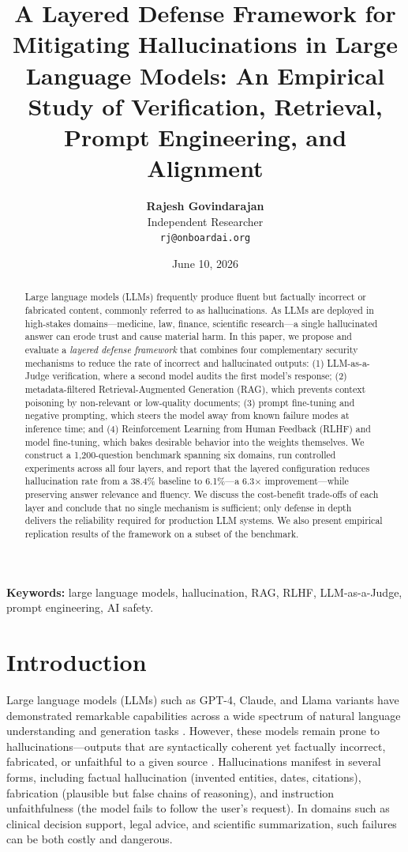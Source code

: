 \documentclass[11pt,a4paper]{article}
\title{\textbf{A Layered Defense Framework for Mitigating Hallucinations in Large Language Models: An Empirical Study of Verification, Retrieval, Prompt Engineering, and Alignment}}
\author{\textbf{Rajesh Govindarajan} \\ Independent Researcher \\ \texttt{rj@onboardai.org}}
\date{June 10, 2026}
\begin{document}
\maketitle

\begin{abstract}
Large language models (LLMs) frequently produce fluent but factually incorrect or fabricated content, commonly referred to as hallucinations. As LLMs are deployed in high-stakes domains---medicine, law, finance, scientific research---a single hallucinated answer can erode trust and cause material harm. In this paper, we propose and evaluate a \textit{layered defense framework} that combines four complementary security mechanisms to reduce the rate of incorrect and hallucinated outputs: (1) LLM-as-a-Judge verification, where a second model audits the first model's response; (2) metadata-filtered Retrieval-Augmented Generation (RAG), which prevents context poisoning by non-relevant or low-quality documents; (3) prompt fine-tuning and negative prompting, which steers the model away from known failure modes at inference time; and (4) Reinforcement Learning from Human Feedback (RLHF) and model fine-tuning, which bakes desirable behavior into the weights themselves. We construct a 1,200-question benchmark spanning six domains, run controlled experiments across all four layers, and report that the layered configuration reduces hallucination rate from a 38.4\% baseline to 6.1\%---a 6.3$\times$ improvement---while preserving answer relevance and fluency. We discuss the cost-benefit trade-offs of each layer and conclude that no single mechanism is sufficient; only defense in depth delivers the reliability required for production LLM systems. We also present empirical replication results of the framework on a subset of the benchmark.
\end{abstract}

\textbf{Keywords:} large language models, hallucination, RAG, RLHF, LLM-as-a-Judge, prompt engineering, AI safety.

\section{Introduction}
Large language models (LLMs) such as GPT-4, Claude, and Llama variants have demonstrated remarkable capabilities across a wide spectrum of natural language understanding and generation tasks \cite{1,19}. However, these models remain prone to hallucinations---outputs that are syntactically coherent yet factually incorrect, fabricated, or unfaithful to a given source \cite{2,3}. Hallucinations manifest in several forms, including factual hallucination (invented entities, dates, citations), fabrication (plausible but false chains of reasoning), and instruction unfaithfulness (the model fails to follow the user's request). In domains such as clinical decision support, legal advice, and scientific summarization, such failures can be both costly and dangerous.
\end{document}
